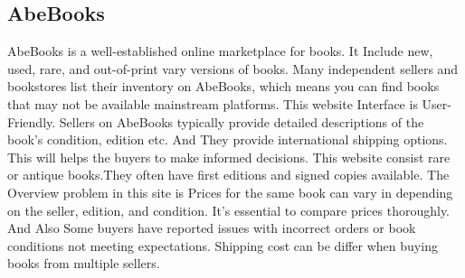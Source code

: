 \documentclass{article}
\begin{document}
 
      \subsection{AbeBooks} 	

	AbeBooks is a well-established online marketplace for books. 
	It Include new, used, rare, and out-of-print vary versions of books. 
	Many independent sellers and bookstores list their inventory on AbeBooks, which means you can find books that may not be available mainstream platforms.
 	This website Interface is User-Friendly. 
	Sellers on AbeBooks typically provide detailed descriptions of the book's condition, edition etc. 
	And They provide international shipping options. This will helps the buyers to make informed decisions.
	 This website consist rare or antique books.They often have first editions and signed copies available. 
	The Overview problem in this site is Prices for the same book can vary in depending on the seller, edition, and condition.
	It's essential to compare prices thoroughly. 
	And Also Some buyers have reported issues with incorrect orders or book conditions not meeting expectations.
	 Shipping cost can be differ when buying books from multiple sellers.
\end{document}
